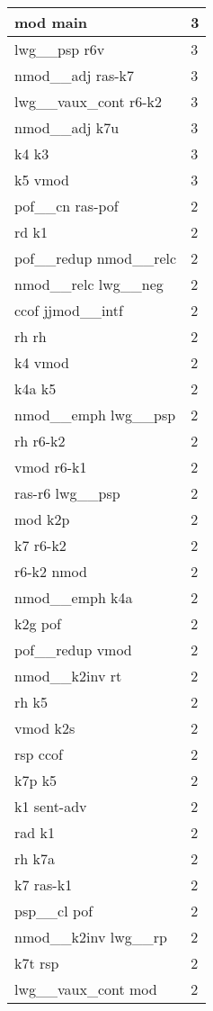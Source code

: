 \documentclass[a4 paper]{article}
\begin{document}
\begin{longtable}{p{}p{}}
mod main  & 3 \\ \midrule
lwg\_\_psp r6v  & 3 \\ \midrule
nmod\_\_adj ras-k7  & 3 \\ \midrule
lwg\_\_vaux\_cont r6-k2  & 3 \\ \midrule
nmod\_\_adj k7u  & 3 \\ \midrule
k4 k3  & 3 \\ \midrule
k5 vmod  & 3 \\ \midrule
pof\_\_cn ras-pof  & 2 \\ \midrule
rd k1  & 2 \\ \midrule
pof\_\_redup nmod\_\_relc  & 2 \\ \midrule
nmod\_\_relc lwg\_\_neg  & 2 \\ \midrule
ccof jjmod\_\_intf  & 2 \\ \midrule
rh rh  & 2 \\ \midrule
k4 vmod  & 2 \\ \midrule
k4a k5  & 2 \\ \midrule
nmod\_\_emph lwg\_\_psp  & 2 \\ \midrule
rh r6-k2  & 2 \\ \midrule
vmod r6-k1  & 2 \\ \midrule
ras-r6 lwg\_\_psp  & 2 \\ \midrule
mod k2p  & 2 \\ \midrule
k7 r6-k2  & 2 \\ \midrule
r6-k2 nmod  & 2 \\ \midrule
nmod\_\_emph k4a  & 2 \\ \midrule
k2g pof  & 2 \\ \midrule
pof\_\_redup vmod  & 2 \\ \midrule
nmod\_\_k2inv rt  & 2 \\ \midrule
rh k5  & 2 \\ \midrule
vmod k2s  & 2 \\ \midrule
rsp ccof  & 2 \\ \midrule
k7p k5  & 2 \\ \midrule
k1 sent-adv  & 2 \\ \midrule
rad k1  & 2 \\ \midrule
rh k7a  & 2 \\ \midrule
k7 ras-k1  & 2 \\ \midrule
psp\_\_cl pof  & 2 \\ \midrule
nmod\_\_k2inv lwg\_\_rp  & 2 \\ \midrule
k7t rsp  & 2 \\ \midrule
lwg\_\_vaux\_cont mod  & 2 \\ \midrule

\end{longtable}
\end{document}

